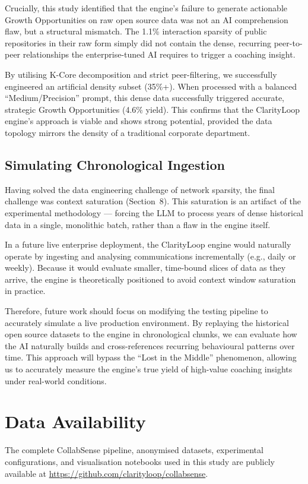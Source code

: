 \documentclass[conference]{IEEEconf}
\begin{document}
Crucially, this study identified that the engine's failure to generate actionable Growth Opportunities on raw open source data was not an AI comprehension flaw, but a structural mismatch. The 1.1\% interaction sparsity of public repositories in their raw form simply did not contain the dense, recurring peer-to-peer relationships the enterprise-tuned AI requires to trigger a coaching insight.

By utilising K-Core decomposition and strict peer-filtering, we successfully engineered an artificial density subset (35\%+). When processed with a balanced ``Medium/Precision'' prompt, this dense data successfully triggered accurate, strategic Growth Opportunities (4.6\% yield). This confirms that the ClarityLoop engine's approach is viable and shows strong potential, provided the data topology mirrors the density of a traditional corporate department.

\subsection{Simulating Chronological Ingestion}
Having solved the data engineering challenge of network sparsity, the final challenge was context saturation (Section~8). This saturation is an artifact of the experimental methodology --- forcing the LLM to process years of dense historical data in a single, monolithic batch, rather than a flaw in the engine itself.

In a future live enterprise deployment, the ClarityLoop engine would naturally operate by ingesting and analysing communications incrementally (e.g., daily or weekly). Because it would evaluate smaller, time-bound slices of data as they arrive, the engine is theoretically positioned to avoid context window saturation in practice.

Therefore, future work should focus on modifying the testing pipeline to accurately simulate a live production environment. By replaying the historical open source datasets to the engine in chronological chunks, we can evaluate how the AI naturally builds and cross-references recurring behavioural patterns over time. This approach will bypass the ``Lost in the Middle'' phenomenon, allowing us to accurately measure the engine's true yield of high-value coaching insights under real-world conditions.

\section*{Data Availability}
The complete CollabSense pipeline, anonymised datasets, experimental configurations, and visualisation notebooks used in this study are publicly available at \url{https://github.com/clarityloop/collabsense}.
\end{document}
